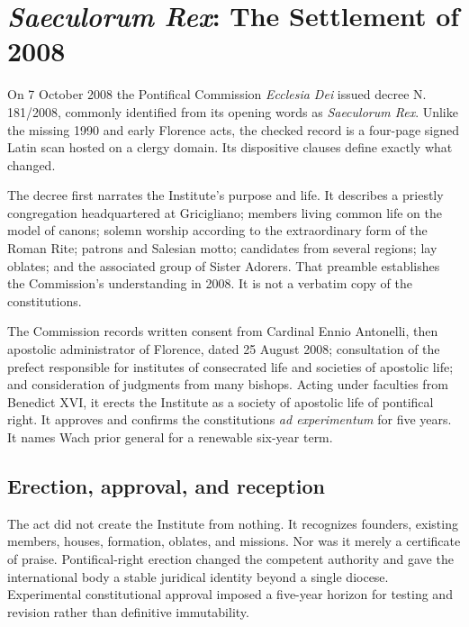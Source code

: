 \section{\emph{Saeculorum Rex}: The Settlement of 2008}

On 7 October 2008 the Pontifical Commission \emph{Ecclesia Dei} issued decree N. 181/2008, commonly identified from its opening words as \emph{Saeculorum Rex}. Unlike the missing 1990 and early Florence acts, the checked record is a four-page signed Latin scan hosted on a clergy domain. Its dispositive clauses define exactly what changed.

The decree first narrates the Institute's purpose and life. It describes a priestly congregation headquartered at Gricigliano; members living common life on the model of canons; solemn worship according to the extraordinary form of the Roman Rite; patrons and Salesian motto; candidates from several regions; lay oblates; and the associated group of Sister Adorers. That preamble establishes the Commission's understanding in 2008. It is not a verbatim copy of the constitutions.

The Commission records written consent from Cardinal Ennio Antonelli, then apostolic administrator of Florence, dated 25 August 2008; consultation of the prefect responsible for institutes of consecrated life and societies of apostolic life; and consideration of judgments from many bishops. Acting under faculties from Benedict XVI, it erects the Institute as a society of apostolic life of pontifical right. It approves and confirms the constitutions \emph{ad experimentum} for five years. It names Wach prior general for a renewable six-year term.


\subsection{Erection, approval, and reception}

The act did not create the Institute from nothing. It recognizes founders, existing members, houses, formation, oblates, and missions. Nor was it merely a certificate of praise. Pontifical-right erection changed the competent authority and gave the international body a stable juridical identity beyond a single diocese. Experimental constitutional approval imposed a five-year horizon for testing and revision rather than definitive immutability.

